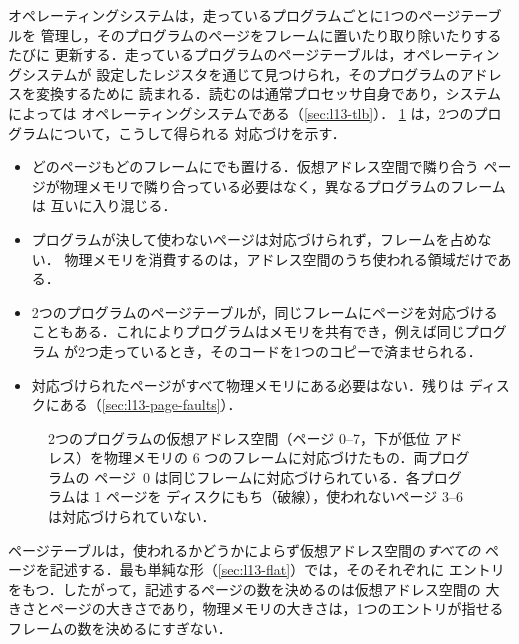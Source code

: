 \documentclass[../main.tex]{subfiles}
\begin{document}
オペレーティングシステムは，走っているプログラムごとに1つのページテーブルを
管理し，そのプログラムのページをフレームに置いたり取り除いたりするたびに
更新する．走っているプログラムのページテーブルは，オペレーティングシステムが
設定したレジスタを通じて見つけられ，そのプログラムのアドレスを変換するために
読まれる．読むのは通常プロセッサ自身であり，システムによっては
オペレーティングシステムである（\cref{sec:l13-tlb}）．
\cref{fig:l13-mapping} は，2つのプログラムについて，こうして得られる
対応づけを示す．
\begin{itemize}
  \item どのページもどのフレームにでも置ける．仮想アドレス空間で隣り合う
    ページが物理メモリで隣り合っている必要はなく，異なるプログラムのフレームは
    互いに入り混じる．
  \item プログラムが決して使わないページは対応づけられず，フレームを占めない．
    物理メモリを消費するのは，アドレス空間のうち使われる領域だけである．
  \item 2つのプログラムのページテーブルが，同じフレームにページを対応づける
    こともある．これによりプログラムはメモリを共有でき，例えば同じプログラム
    が2つ走っているとき，そのコードを1つのコピーで済ませられる．
  \item 対応づけられたページがすべて物理メモリにある必要はない．残りは
    ディスクにある（\cref{sec:l13-page-faults}）．
\end{itemize}

\begin{figure}[htbp]
  \centering
  
  \caption{2つのプログラムの仮想アドレス空間（ページ 0--7，下が低位
    アドレス）を物理メモリの 6 つのフレームに対応づけたもの．両プログラムの
    ページ~0 は同じフレームに対応づけられている．各プログラムは 1 ページを
    ディスクにもち（破線），使われないページ 3--6 は対応づけられていない．}
  \label{fig:l13-mapping}
\end{figure}

ページテーブルは，使われるかどうかによらず仮想アドレス空間の\emph{すべての}
ページを記述する．最も単純な形（\cref{sec:l13-flat}）では，そのそれぞれに
エントリをもつ．したがって，記述するページの数を決めるのは仮想アドレス空間の
大きさとページの大きさであり，物理メモリの大きさは，1つのエントリが指せる
フレームの数を決めるにすぎない．
\end{document}
